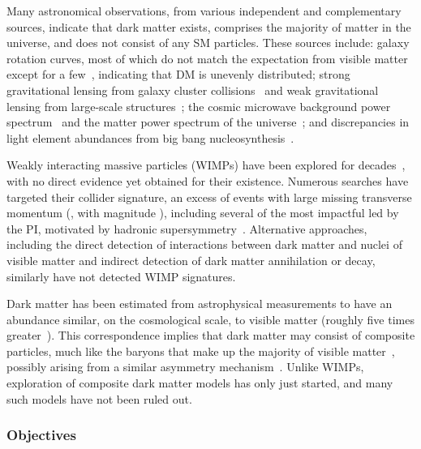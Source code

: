 Many astronomical observations, from various independent and complementary sources,
indicate that dark matter exists, comprises the majority of matter in the universe, and does not consist of any SM particles.
These sources include:
galaxy rotation curves, most of which do not match the expectation from visible matter~\cite{Rubin:1980zd,Persic:1995ru} except for a few~\cite{vanDokkum:2018vup,PinaMancera:2021wpc}, indicating that DM is unevenly distributed;
strong gravitational lensing from galaxy cluster collisions~\cite{Clowe:2006eq} and weak gravitational lensing from large-scale structures~\cite{Chang:2017kmv};
the cosmic microwave background power spectrum~\cite{Planck:2018vyg} and the matter power spectrum of the universe~\cite{Dodelson:2011qv,Planck:2018nkj};
and discrepancies in light element abundances from big bang nucleosynthesis~\cite{Pospelov:2010hj}.

Weakly interacting massive particles (WIMPs) have been explored for decades~\cite{Jungman:1995df}, with no direct evidence yet obtained for their existence.
Numerous searches have targeted their collider signature, an excess of events with large missing transverse momentum (\ptvecmiss, with magnitude \met),
including several of the most impactful led by the PI, motivated by hadronic supersymmetry~\cite{Khachatryan:2016kdk,Sirunyan:2017cwe,Sirunyan:2019hzr,Sirunyan:2019ctn,CMS:2023xlp}.
Alternative approaches, including the direct detection of interactions between dark matter and nuclei of visible matter
and indirect detection of dark matter annihilation or decay, similarly have not detected WIMP signatures.

Dark matter has been estimated from astrophysical measurements to have an abundance similar,
on the cosmological scale, to visible matter (roughly five times greater~\cite{Ade:2015xua}).
This correspondence implies that dark matter may consist of composite particles, much like the baryons that make up the majority of visible matter~\cite{Bai:2013xga,Bodas:2024idn},
possibly arising from a similar asymmetry mechanism~\cite{Petraki:2013wwa}.
Unlike WIMPs, exploration of composite dark matter models has only just started, and many such models have not been ruled out.

\subsubsection{Objectives}\label{subsec:dmobj}

